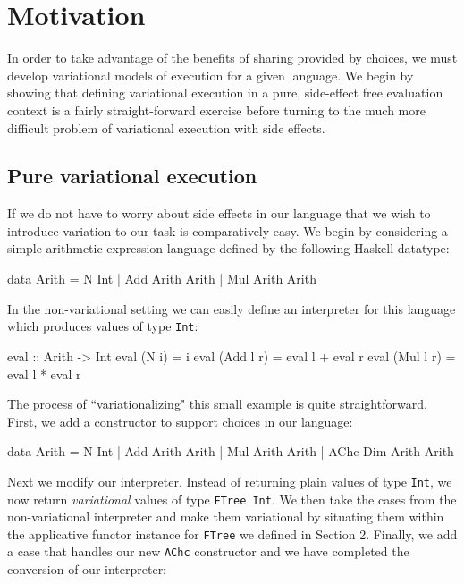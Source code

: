 \documentclass[letterpaper,10pt,onecolumn]{article}
\newcommand{\prog}[1]{{\small\texttt{#1}}}
\begin{document}
\section{Motivation}

In order to take advantage of the benefits of sharing provided by choices, we must develop variational
models of execution for a given language. We begin by showing that defining variational execution in a pure,
side-effect free evaluation context is a fairly straight-forward exercise before turning to the much more
difficult problem of variational execution with side effects.

\subsection{Pure variational execution}

If we do not have to worry about side effects in our language that we wish to introduce variation to
our task is comparatively easy. We begin by considering a simple arithmetic expression language
defined by the following Haskell datatype:

\begin{program}
data Arith = N Int | Add Arith Arith | Mul Arith Arith
\end{program}

In the non-variational setting we can easily define an interpreter for this language which produces
values of type \prog{Int}:

\begin{program}
eval :: Arith -> Int
eval (N i) = i
eval (Add l r) = eval l + eval r
eval (Mul l r) = eval l * eval r
\end{program}

The process of ``variationalizing" this small example is quite straightforward. First, we add a
constructor to support choices in our language:

\begin{program}
data Arith = N Int | Add Arith Arith | Mul Arith Arith | AChc Dim Arith Arith
\end{program}

Next we modify our interpreter. Instead of returning plain values of type \prog{Int},
we now return \emph{variational} values of type \prog{FTree Int}. We then take the cases
from the non-variational interpreter and make them variational by situating them within the
applicative functor instance for \prog{FTree} we defined in Section 2. Finally, we add a case
that handles our new \prog{AChc} constructor and we have completed the conversion of our
interpreter:
\end{document}
